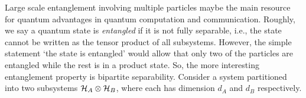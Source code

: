 \documentclass[
aps,
pra,
twocolumn,
floatfix,
]{revtex4-2}
\theoremstyle{plain}
\theoremstyle{definition}
\newtheorem{definition}{Definition}
\newcommand{\dm}{\rho}
\newcommand{\separable}{\mathcal{S}}
\newcommand{\ppartition}{\mathcal{P}}
\begin{document}
Large scale entanglement involving multiple particles maybe the main resource for quantum advantages in quantum computation and communication.
Roughly, we say a quantum state is \emph{entangled} if it is not fully separable,
i.e., the state cannot be written as the tensor product of all subsystems.
However, the simple statement `the state is entangled' would allow that only two of the particles are entangled while the rest is in a product state.
So, the more interesting entanglement property is bipartite separability.
Consider a system partitioned into two subsystems $\mathcal{H}_A \otimes \mathcal{H}_B$, where each has dimension $d_A$ and $d_B$ respectively.
\end{document}
